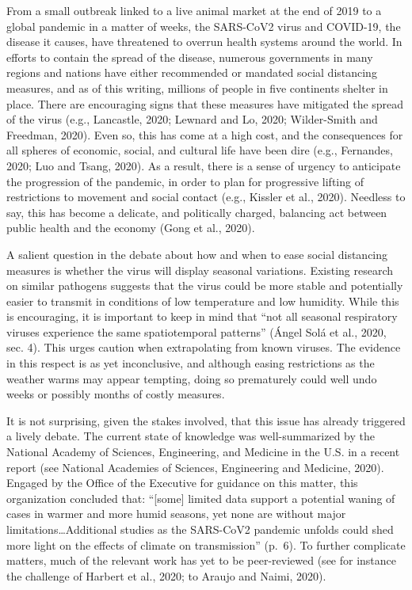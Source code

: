 \documentclass[]{elsarticle} %
\begin{document}
From a small outbreak linked to a live animal market at the end of 2019
to a global pandemic in a matter of weeks, the SARS-CoV2 virus and
COVID-19, the disease it causes, have threatened to overrun health
systems around the world. In efforts to contain the spread of the
disease, numerous governments in many regions and nations have either
recommended or mandated social distancing measures, and as of this
writing, millions of people in five continents shelter in place. There
are encouraging signs that these measures have mitigated the spread of
the virus (e.g., Lancastle, 2020; Lewnard and Lo, 2020; Wilder-Smith and
Freedman, 2020). Even so, this has come at a high cost, and the
consequences for all spheres of economic, social, and cultural life have
been dire (e.g., Fernandes, 2020; Luo and Tsang, 2020). As a result,
there is a sense of urgency to anticipate the progression of the
pandemic, in order to plan for progressive lifting of restrictions to
movement and social contact (e.g., Kissler et al., 2020). Needless to
say, this has become a delicate, and politically charged, balancing act
between public health and the economy (Gong et al., 2020).

A salient question in the debate about how and when to ease social
distancing measures is whether the virus will display seasonal
variations. Existing research on similar pathogens suggests that the
virus could be more stable and potentially easier to transmit in
conditions of low temperature and low humidity. While this is
encouraging, it is important to keep in mind that ``not all seasonal
respiratory viruses experience the same spatiotemporal patterns'' (Ángel
Solá et al., 2020, sec. 4). This urges caution when extrapolating from
known viruses. The evidence in this respect is as yet inconclusive, and
although easing restrictions as the weather warms may appear tempting,
doing so prematurely could well undo weeks or possibly months of costly
measures.

It is not surprising, given the stakes involved, that this issue has
already triggered a lively debate. The current state of knowledge was
well-summarized by the National Academy of Sciences, Engineering, and
Medicine in the U.S. in a recent report (see National Academies of
Sciences, Engineering and Medicine, 2020). Engaged by the Office of the
Executive for guidance on this matter, this organization concluded that:
``{[}some{]} limited data support a potential waning of cases in warmer
and more humid seasons, yet none are without major
limitations\ldots Additional studies as the SARS-CoV2 pandemic unfolds
could shed more light on the effects of climate on transmission''
(p.~6). To further complicate matters, much of the relevant work has yet
to be peer-reviewed (see for instance the challenge of Harbert et al.,
2020; to Araujo and Naimi, 2020).
\end{document}

